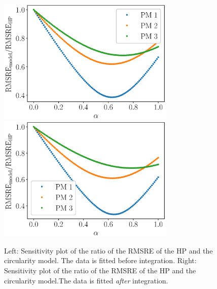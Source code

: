 \documentclass[draft,jgrga]{agutexSI2019}
\begin{document}
\begin{table}[htbp!]
\caption{Summary of consistant model fitting on integral data and error measure}
\end{table}

\begin{figure}
\includegraphics[height=6cm]{figures/RMSRE_consistent_alpha.eps}
\includegraphics[height=6cm]{figures/RMSRE_consistent_alpha_integral.eps}
\caption{Left: Sensitivity plot of the ratio of the RMSRE of the HP and the circularity model. The data is fitted before integration. Right: Sensitivity plot of the ratio of the RMSRE of the HP and the circularity model.The data is fitted \textit{after} integration. }
\label{fig:sensitivity_plot_alpha}
\end{figure}
\end{document}
